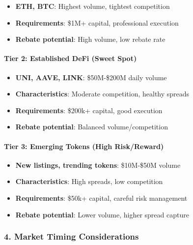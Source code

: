 \begin{itemize}
\tightlist
\item
  \textbf{ETH, BTC}: Highest volume, tightest competition
\item
  \textbf{Requirements}: \$1M+ capital, professional execution
\item
  \textbf{Rebate potential}: High volume, low rebate rate
\end{itemize}

\hypertarget{tier-2-established-defi-sweet-spot}{%
\paragraph{\texorpdfstring{\textbf{Tier 2: Established DeFi (Sweet
Spot)}}{Tier 2: Established DeFi (Sweet Spot)}}\label{tier-2-established-defi-sweet-spot}}

\begin{itemize}
\tightlist
\item
  \textbf{UNI, AAVE, LINK}: \$50M-\$200M daily volume
\item
  \textbf{Characteristics}: Moderate competition, healthy spreads
\item
  \textbf{Requirements}: \$200k+ capital, good execution
\item
  \textbf{Rebate potential}: Balanced volume/competition
\end{itemize}

\hypertarget{tier-3-emerging-tokens-high-riskreward}{%
\paragraph{\texorpdfstring{\textbf{Tier 3: Emerging Tokens (High
Risk/Reward)}}{Tier 3: Emerging Tokens (High Risk/Reward)}}\label{tier-3-emerging-tokens-high-riskreward}}

\begin{itemize}
\tightlist
\item
  \textbf{New listings, trending tokens}: \$10M-\$50M volume
\item
  \textbf{Characteristics}: High spreads, low competition
\item
  \textbf{Requirements}: \$50k+ capital, careful risk management
\item
  \textbf{Rebate potential}: Lower volume, higher spread capture
\end{itemize}

\hypertarget{market-timing-considerations}{%
\subsubsection{\texorpdfstring{4. \textbf{Market Timing
Considerations}}{4. Market Timing Considerations}}\label{market-timing-considerations}}

